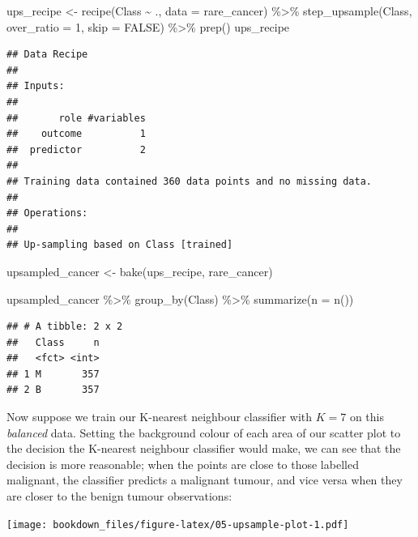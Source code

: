 \documentclass[
]{krantz}
\makeatletter
\newenvironment{Shaded}{\begin{snugshade}}{\end{snugshade}}
\newcommand{\AttributeTok}[1]{\textcolor[rgb]{0.61,0.61,0.61}{#1}}
\newcommand{\ConstantTok}[1]{\textcolor[rgb]{0,0,0}{#1}}
\newcommand{\DecValTok}[1]{\textcolor[rgb]{0.06,0.06,0.06}{#1}}
\newcommand{\FunctionTok}[1]{\textcolor[rgb]{0,0,0}{#1}}
\newcommand{\NormalTok}[1]{#1}
\newcommand{\OtherTok}[1]{\textcolor[rgb]{0.37,0.37,0.37}{#1}}
\newcommand{\SpecialCharTok}[1]{\textcolor[rgb]{0,0,0}{#1}}
\newenvironment{kframe}{%
\medskip{}
\setlength{\fboxsep}{.8em}
 \def\at@end@of@kframe{}%
 \ifinner\ifhmode%
  \def\at@end@of@kframe{\end{minipage}}%
  \begin{minipage}{\columnwidth}%
 \fi\fi%
 \def\FrameCommand##1{\hskip\@totalleftmargin \hskip-\fboxsep
 \colorbox{shadecolor}{##1}\hskip-\fboxsep
     \hskip-\linewidth \hskip-\@totalleftmargin \hskip\columnwidth}%
 \MakeFramed {\advance\hsize-\width
   \@totalleftmargin\z@ \linewidth\hsize
   \@setminipage}}%
 {\par\unskip\endMakeFramed%
 \at@end@of@kframe}
\renewenvironment{Shaded}{\begin{kframe}}{\end{kframe}}
\makeatother
\begin{document}
\begin{Shaded}
\begin{Highlighting}[]
\NormalTok{ups\_recipe }\OtherTok{\textless{}{-}} \FunctionTok{recipe}\NormalTok{(Class }\SpecialCharTok{\textasciitilde{}}\NormalTok{ ., }\AttributeTok{data =}\NormalTok{ rare\_cancer) }\SpecialCharTok{\%\textgreater{}\%}
  \FunctionTok{step\_upsample}\NormalTok{(Class, }\AttributeTok{over\_ratio =} \DecValTok{1}\NormalTok{, }\AttributeTok{skip =} \ConstantTok{FALSE}\NormalTok{) }\SpecialCharTok{\%\textgreater{}\%}
  \FunctionTok{prep}\NormalTok{()}
\NormalTok{ups\_recipe}
\end{Highlighting}
\end{Shaded}

\begin{verbatim}
## Data Recipe
## 
## Inputs:
## 
##       role #variables
##    outcome          1
##  predictor          2
## 
## Training data contained 360 data points and no missing data.
## 
## Operations:
## 
## Up-sampling based on Class [trained]
\end{verbatim}

\begin{Shaded}
\begin{Highlighting}[]
\NormalTok{upsampled\_cancer }\OtherTok{\textless{}{-}} \FunctionTok{bake}\NormalTok{(ups\_recipe, rare\_cancer)}

\NormalTok{upsampled\_cancer }\SpecialCharTok{\%\textgreater{}\%}
  \FunctionTok{group\_by}\NormalTok{(Class) }\SpecialCharTok{\%\textgreater{}\%}
  \FunctionTok{summarize}\NormalTok{(}\AttributeTok{n =} \FunctionTok{n}\NormalTok{())}
\end{Highlighting}
\end{Shaded}

\begin{verbatim}
## # A tibble: 2 x 2
##   Class     n
##   <fct> <int>
## 1 M       357
## 2 B       357
\end{verbatim}

Now suppose we train our K-nearest neighbour classifier with \(K=7\) on this \emph{balanced} data. Setting the background colour
of each area of our scatter plot to the decision the K-nearest neighbour
classifier would make, we can see that the decision is more reasonable; when the points are close
to those labelled malignant, the classifier predicts a malignant tumour, and vice versa when they are closer to the benign tumour observations:

\texttt{[image: bookdown\_files/figure-latex/05-upsample-plot-1.pdf]}
\end{document}
